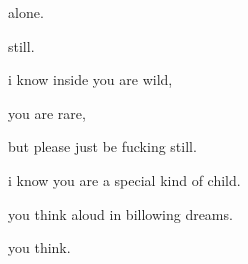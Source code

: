 \documentclass[extrafontsizes, 48pt]{memoir}
\newcommand\blankpage{%
    \null
    \thispagestyle{empty}%
    \addtocounter{page}{-1}%
    \newpage}
\begin{document}
	\begin{minipage}{.6\textwidth}
	alone.
	\end{minipage}
	\newpage

	\begin{minipage}{.6\textwidth}
	still.
	\afterpage{\blankpage}
	\end{minipage}
	\newpage

	\begin{minipage}{.6\textwidth}
	i know inside you are wild,
	\end{minipage}
	\newpage

	\begin{minipage}{.6\textwidth}
	you are rare,
	\end{minipage}
	\newpage

	\begin{minipage}{.6\textwidth}
	but please just be fucking still.
	\afterpage{\blankpage}
	\end{minipage}
	\newpage

	\begin{minipage}{.6\textwidth}
	i know you are a special kind of child.
	\end{minipage}
	\newpage

	\begin{minipage}{.6\textwidth}
	you think aloud in billowing dreams.
	\end{minipage}
	\newpage

	\begin{minipage}{.6\textwidth}
	you think.
	\end{minipage}
	\newpage
\end{document}
